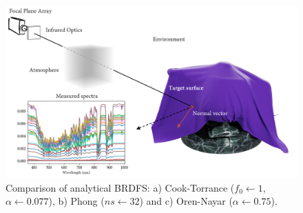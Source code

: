 \begin{figure}[ht]
	\includegraphics[width=\textwidth]{figs/fundamentals/physic_principles.png}
	\caption{Comparison of analytical BRDFS: a) Cook-Torrance ($f_0 \gets 1$, $\alpha \gets 0.077$), b) Phong ($ns \gets 32$) and c) Oren-Nayar ($\alpha \gets 0.75$). }
    \label{fig:physic_principles}
\end{figure}

